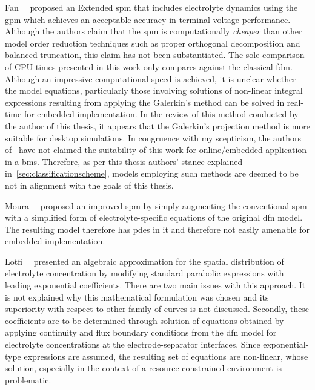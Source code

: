 Fan~\etal~\cite{Fan2016}   proposed   an   Extended  \gls{spm}   that   includes
electrolyte dynamics using  the \gls{gpm} which achieves  an acceptable accuracy
in terminal voltage  performance. Although the authors claim  that the \gls{spm}
is computationally  \emph{cheaper} than  other model order  reduction techniques
such as proper orthogonal decomposition  and balanced truncation, this claim has
not  been substantiated.  The sole  comparison of  CPU times  presented in  this
work  only compares  against  the classical  \gls{fdm}.  Although an  impressive
computational  speed is  achieved, it  is unclear  whether the  model equations,
particularly  those  involving  solutions  of  non-linear  integral  expressions
resulting from  applying the Galerkin's  method can  be solved in  real-time for
embedded implementation.  In the review of  this method conducted by  the author
of  this thesis,  it  appears  that the  Galerkin's  projection  method is  more
suitable  for  desktop  simulations.  In  congruence  with  my  scepticism,  the
authors  of~\cite{Fan2016} have  not claimed  the suitability  of this  work for
online/embedded  application  in a  \gls{bms}.  Therefore,  as per  this  thesis
authors' stance  explained in~\cref{sec:classificationscheme},  models employing
such methods are deemed to be not in alignment with the goals of this thesis.

Moura~\etal~\cite{Moura2017} proposed an improved \gls{spm} by simply augmenting
the  conventional  \gls{spm}  with  a simplified  form  of  electrolyte-specific
equations of  the original  \gls{dfn} model. The  resulting model  therefore has
\glspl{pde} in it and therefore not easily amenable for embedded implementation.

Lotfi~\etal~\cite{Lotfi2017}  presented  an   algebraic  approximation  for  the
spatial  distribution   of  electrolyte  concentration  by   modifying  standard
parabolic expressions with leading exponential  coefficients. There are two main
issues with this approach. It is not explained why this mathematical formulation
was chosen  and its superiority  with respect to other  family of curves  is not
discussed. Secondly, these coefficients are to be determined through solution of
equations obtained by applying continuity  and flux boundary conditions from the
\gls{dfn}  model  for  electrolyte  concentrations  at  the  electrode-separator
interfaces. Since exponential-type expressions are assumed, the resulting set of
equations  are  non-linear, whose  solution,  especially  in  the context  of  a
resource-constrained environment is problematic.

